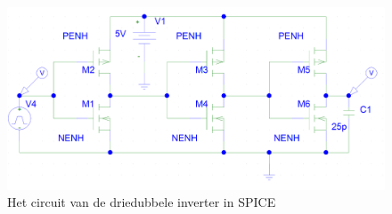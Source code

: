 \begin{enumerate}
\begin{figure} [h!]
\centering
\includegraphics [width = \textwidth] {inputfiles/Cascade_circuit}
\caption{Het circuit van de driedubbele inverter in SPICE}
\label{E2}
\end{figure}
\end{enumerate}

